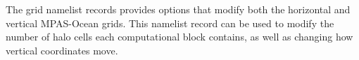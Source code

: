 The grid namelist records provides options that modify both the horizontal and
vertical MPAS-Ocean grids. This namelist record can be used to modify the
number of halo cells each computational block contains, as well as changing how
vertical coordinates move.
